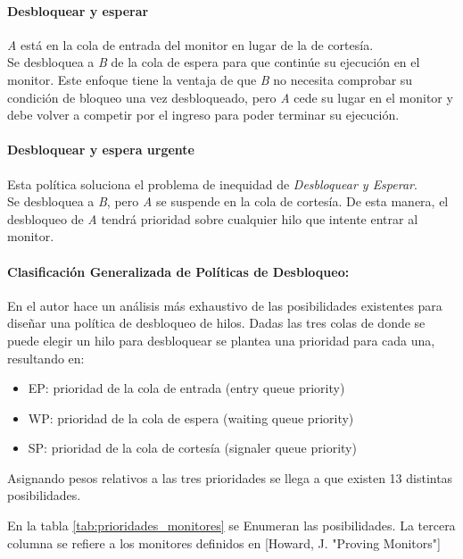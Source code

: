 \paragraph{Desbloquear y esperar}
\textit{A} está en la cola de entrada del monitor en lugar de la de cortesía.\\
Se desbloquea a \textit{B} de la cola de espera para que continúe su ejecución
en el monitor. Este enfoque tiene la ventaja de que \textit{B} no necesita
comprobar su condición de bloqueo una vez desbloqueado, pero \textit{A} cede su
lugar en el monitor y debe volver a competir por el ingreso para poder terminar
su ejecución.


\paragraph{Desbloquear y espera urgente}
Esta política soluciona el problema de inequidad de \textit{Desbloquear y
Esperar}.\\
Se desbloquea a \textit{B}, pero \textit{A} se suspende en la cola de cortesía.
De esta manera, el desbloqueo de \textit{A} tendrá prioridad sobre cualquier
hilo que intente entrar al monitor.

\paragraph{Clasificación Generalizada de Políticas de Desbloqueo:}
En \cite{MonitorClassification} el autor hace un análisis más exhaustivo de las
posibilidades existentes para diseñar una política de desbloqueo de hilos.
Dadas las tres colas de donde se puede elegir un hilo para desbloquear se
plantea una prioridad para cada una, resultando en:
\begin{itemize}
    \item EP: prioridad de la cola de entrada (entry queue priority)
    \item WP: prioridad de la cola de espera (waiting queue priority)
    \item SP: prioridad de la cola de cortesía (signaler queue priority)
\end{itemize}
Asignando pesos relativos a las tres prioridades se llega a que existen 13
distintas posibilidades.

En la tabla \ref{tab:prioridades_monitores} se Enumeran las posibilidades. La
tercera columna se refiere a los monitores definidos en [Howard, J. "Proving
Monitors"]

